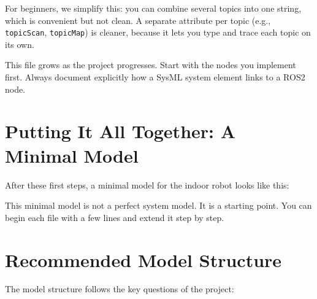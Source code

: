 For beginners, we simplify this: you can combine several topics into one string, which is convenient but not clean. A separate attribute per topic (e.g., \texttt{topicScan}, \texttt{topicMap}) is cleaner, because it lets you type and trace each topic on its own.

This file grows as the project progresses. Start with the nodes you implement first. Always document explicitly how a SysML system element links to a ROS2 node.

\section{Putting It All Together: A Minimal Model}

After these first steps, a minimal model for the indoor robot looks like this:

\begin{center}
\end{center}

This minimal model is not a perfect system model. It is a starting point. You can begin each file with a few lines and extend it step by step.

\section{Recommended Model Structure}
The model structure follows the key questions of the project:

